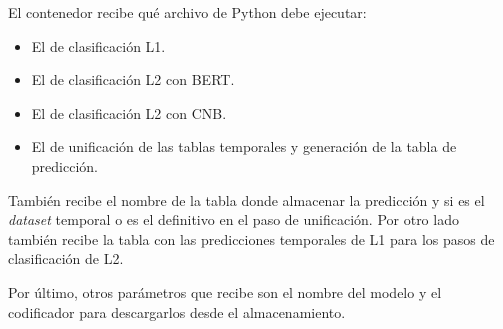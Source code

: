 El contenedor recibe qué archivo de Python debe ejecutar: 
\begin{itemize}
	\item El de clasificación L1.
	\item El de clasificación L2 con BERT.
	\item El de clasificación L2 con CNB.
	\item El de unificación de las tablas temporales y generación de la tabla de predicción.
\end{itemize}

También recibe el nombre de la tabla donde almacenar la predicción y si es el \textit{dataset} temporal o es el definitivo en el paso de unificación. Por otro lado también recibe la tabla con las predicciones temporales de L1 para los pasos de clasificación de L2.

Por último, otros parámetros que recibe son el nombre del modelo y el codificador para descargarlos desde el almacenamiento.
